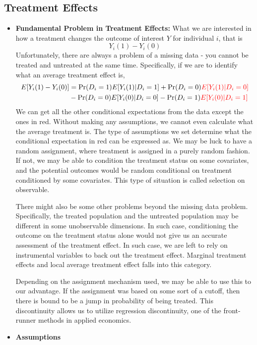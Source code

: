 \documentclass[12pt]{article}
\theoremstyle{definition}
\theoremstyle{property}
\theoremstyle{assumption}
\theoremstyle{example}
\theoremstyle{comment}
\begin{document}
\subsection{Treatment Effects}
\begin{itemize}
\item \textbf{Fundamental Problem in Treatment Effects:} What we are interested in how a treatment changes the outcome of interest $Y$ for individual $i$, that is
\[
Y_i(1)-Y_i(0)
\]
Unfortunately, there are always a problem of a missing data - you cannot be treated and untreated at the same time. Specifically, if we are to identify what an average treatment effect is,
\begin{align*}
E[Y_i(1)-Y_i(0)]&=\Pr(D_i=1)E[Y_i(1)|D_i=1]+\Pr(D_i=0)\textcolor{red}{E[Y_i(1)|D_i=0]}\\
&-\Pr(D_i=0)E[Y_i(0)|D_i=0]-\Pr(D_i=1)\textcolor{red}{E[Y_i(0)|D_i=1]}
\end{align*}
We can get all the other conditional expectations from the data except the ones in red. Without making any assumptions, we cannot even calculate what the average treatment is. The type of assumptions we set determine what the conditional expectation in red can be expressed as. We may be luck to have a random assignment, where treatment is assigned in a purely random fashion. If not, we may be able to condition the treatment status on some covariates, and the potential outcomes would be random conditional on treatment conditioned by some covariates. This type of situation is called selection on observable.\par
There might also be some other problems beyond the missing data problem. Specifically, the treated population and the untreated population may be different in some unobservable dimensions. In such case, conditioning the outcome on the treatment status alone would not give us an accurate assessment of the treatment effect. In such case, we are left to rely on instrumental variables to back out the treatment effect. Marginal treatment effects and local average treatment effect falls into this category.\par
Depending on the assignment mechanism used, we may be able to use this to our advantage. If the assignment was based on some sort of a cutoff, then there is bound to be a jump in probability of being treated. This discontinuity allows us to utilize regression discontinuity, one of the front-runner methods in applied economics. 
\item \textbf{Assumptions} 
\begin{itemize}

\end{itemize}
\end{itemize}
\end{document}

